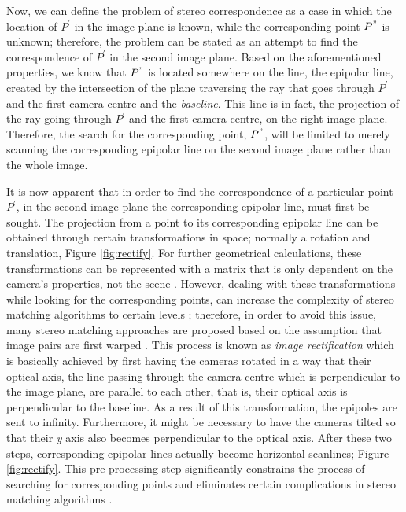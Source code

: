 Now, we can define the problem of stereo correspondence as a case in which the location of $P^{'}$ in the image plane is known, while the
corresponding point $P^{"}$ is unknown; therefore, the problem can be stated as an attempt to find the correspondence of $P^{'}$ in the second image plane. Based on the aforementioned 
properties, we know that $P^{"}$ is located somewhere on the line, the epipolar line,
created by the intersection of the plane traversing the ray that goes through $P^{'}$ and the first camera centre and the {\it baseline}. This line is in fact, the projection of the ray going
through $P^{'}$ and the first camera centre, on the right image plane. Therefore, the search for the corresponding point, $P^{"}$, will be limited to merely scanning the corresponding 
epipolar line on the second image plane rather than the whole image.


It is now apparent that in order to find the correspondence of a particular point $P^{'}$, in the second image plane
the corresponding epipolar line, must first be sought. 
The projection from a point to its corresponding epipolar line can be obtained through certain transformations in space; normally a rotation and translation, Figure \ref{fig:rectify}.
For further geometrical calculations, these transformations can be represented
with a matrix that is only dependent on the camera's properties, not the scene \cite{hart2000}.
However, dealing with these transformations while looking for the corresponding points, can increase the complexity of stereo matching algorithms to certain levels \cite{sze11}; therefore, 
in order to avoid this issue, many stereo matching approaches are proposed based on the assumption that image pairs are first warped \cite{sze11}.
This process is known as {\it image rectification} which is basically achieved by first having the cameras rotated in a way that their optical axis, 
the line passing through the camera centre which is perpendicular to the image plane, are parallel to each other,
that is, their optical axis is perpendicular to the baseline. As a result of this transformation, the epipoles are sent to infinity. 
Furthermore, it might be necessary to have the cameras tilted so that their {\it y} axis also becomes perpendicular to the optical axis. 
After these two steps, corresponding epipolar lines actually become horizontal scanlines; Figure \ref{fig:rectify}. This pre-processing step significantly constrains the process of searching 
for corresponding points and eliminates certain complications in stereo matching algorithms \cite{sze11}.

